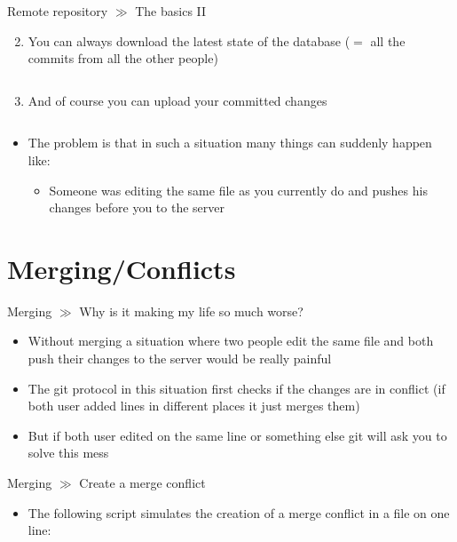 \documentclass[10pt]{beamer}
\begin{document}
\begin{frame}{Remote repository $\gg$ The basics II}
	\begin{enumerate}\setcounter{enumi}{1}
		\item You can always download the latest state of the database ($=$ all the commits from all the other people)
		\inputminted[bgcolor=lightGreyCustom,fontsize=\scriptsize]{sh}{./resources/git_remote_repository_02_pull.sh}
		\item And of course you can upload your committed changes
		\inputminted[bgcolor=lightGreyCustom,fontsize=\scriptsize]{sh}{./resources/git_remote_repository_02_push.sh}
	\end{enumerate}
	\begin{itemize}
		\item The problem is that in such a situation many things can suddenly happen like:
		\begin{itemize}
			\item Someone was editing the same file as you currently do and pushes his changes before you to the server
		\end{itemize}
	\end{itemize}
\end{frame}

\section{Merging/Conflicts}

\begin{frame}{Merging $\gg$ Why is it making my life so much worse?}
	\begin{itemize}
		\item Without merging a situation where two people edit the same file and both push their changes to the server would be really painful
		\item The git protocol in this situation first checks if the changes are in conflict (if both user added lines in different places it just merges them)
		\item But if both user edited on the same line or something else git will ask you to solve this mess
	\end{itemize}
\end{frame}

\begin{frame}{Merging $\gg$ Create a merge conflict}
	\begin{itemize}
		\item The following script simulates the creation of a merge conflict in a file on one line:
		\href{https://jonathanmh.com/how-to-create-a-git-merge-conflict/}{}
		\inputminted[bgcolor=lightGreyCustom,fontsize=\scriptsize]{sh}{./resources/git_merging_03_create_conflict.sh}
	\end{itemize}
\end{frame}
\end{document}
